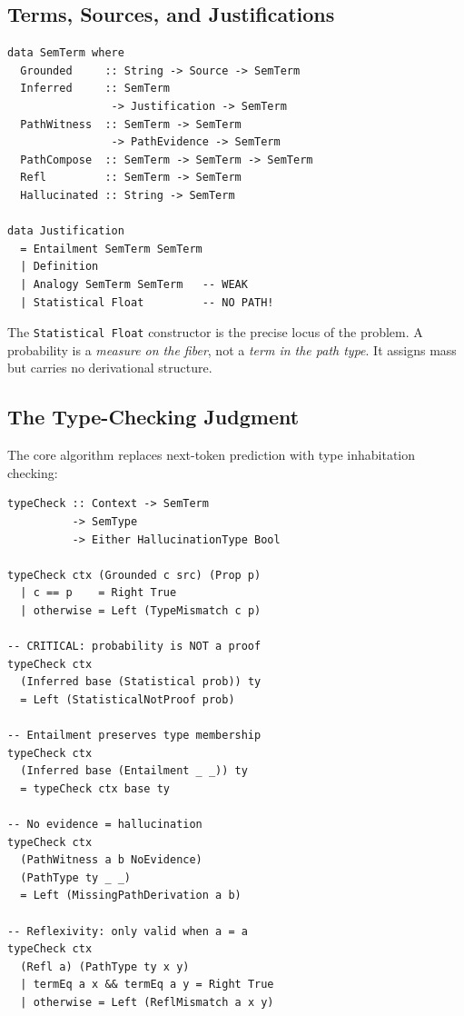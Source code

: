 \documentclass[11pt,a4paper,twocolumn]{article}
\theoremstyle{plain}
\theoremstyle{definition}
\begin{document}
\subsection{Terms, Sources, and Justifications}

\begin{lstlisting}
data SemTerm where
  Grounded     :: String -> Source -> SemTerm
  Inferred     :: SemTerm
                -> Justification -> SemTerm
  PathWitness  :: SemTerm -> SemTerm
                -> PathEvidence -> SemTerm
  PathCompose  :: SemTerm -> SemTerm -> SemTerm
  Refl         :: SemTerm -> SemTerm
  Hallucinated :: String -> SemTerm

data Justification
  = Entailment SemTerm SemTerm
  | Definition
  | Analogy SemTerm SemTerm   -- WEAK
  | Statistical Float         -- NO PATH!
\end{lstlisting}

The \texttt{Statistical Float} constructor is the precise locus of the problem. A probability is a \emph{measure on the fiber}, not a \emph{term in the path type}. It assigns mass but carries no derivational structure.

\subsection{The Type-Checking Judgment}

The core algorithm replaces next-token prediction with type inhabitation checking:

\begin{lstlisting}
typeCheck :: Context -> SemTerm
          -> SemType
          -> Either HallucinationType Bool

typeCheck ctx (Grounded c src) (Prop p)
  | c == p    = Right True
  | otherwise = Left (TypeMismatch c p)

-- CRITICAL: probability is NOT a proof
typeCheck ctx
  (Inferred base (Statistical prob)) ty
  = Left (StatisticalNotProof prob)

-- Entailment preserves type membership
typeCheck ctx
  (Inferred base (Entailment _ _)) ty
  = typeCheck ctx base ty

-- No evidence = hallucination
typeCheck ctx
  (PathWitness a b NoEvidence)
  (PathType ty _ _)
  = Left (MissingPathDerivation a b)

-- Reflexivity: only valid when a = a
typeCheck ctx
  (Refl a) (PathType ty x y)
  | termEq a x && termEq a y = Right True
  | otherwise = Left (ReflMismatch a x y)
\end{lstlisting}
\end{document}
